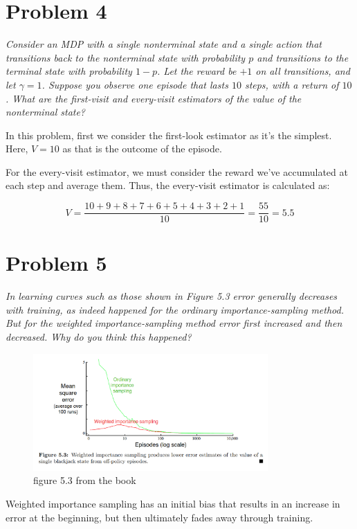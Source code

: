 \documentclass{article}
\begin{document}
\section*{Problem 4}
\textit{Consider an MDP with a single nonterminal state and a single action that transitions back to the nonterminal state with probability $p$ and transitions to the terminal state with probability $1-p$. Let the reward be $+1$ on all transitions, and let $\gamma=1$. Suppose you observe one episode that lasts $10$ steps, with a return of $10$. What are the first-visit and every-visit estimators of the value of the nonterminal state? }

In this problem, first we consider the first-look estimator as it's the simplest. Here, $V=10$ as that is the outcome of the episode.

For the every-visit estimator, we must consider the reward we've accumulated at each step and average them. Thus, the every-visit estimator is calculated as:

\begin{equation}
    V= \frac{10+9+8+7+6+5+4+3+2+1}{10} = \frac{55}{10} = 5.5
\end{equation}

\section*{Problem 5}
\textit{In learning curves such as those shown in Figure 5.3 error generally decreases with training, as indeed happened for the ordinary importance-sampling method. But for the weighted importance-sampling method error first increased and then decreased. Why do you think this happened?}

\begin{figure}
    \centering
    \includegraphics[width = 0.8\textwidth]{imgs/figure53.png}
    \caption{figure 5.3 from the book}
    \label{fig:problem5}
\end{figure}

Weighted importance sampling has an initial bias that results in an increase in error at the beginning, but then ultimately fades away through training.
\end{document}

